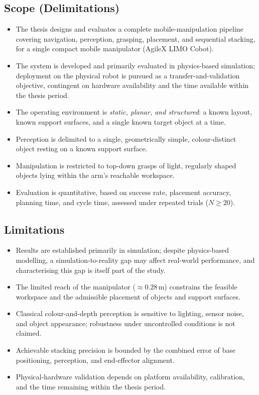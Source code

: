 \documentclass[11pt,a4paper]{article}
\begin{document}
\subsection{Scope (Delimitations)}
\begin{itemize}[label=\checkmark, leftmargin=1.5em, itemsep=0.3em]
    \item The thesis designs and evaluates a complete mobile-manipulation pipeline
          covering navigation, perception, grasping, placement, and sequential stacking,
          for a single compact mobile manipulator (AgileX LIMO Cobot).
    \item The system is developed and primarily evaluated in physics-based simulation;
          deployment on the physical robot is pursued as a transfer-and-validation
          objective, contingent on hardware availability and the time available within
          the thesis period.
    \item The operating environment is \emph{static, planar, and structured}: a known
          layout, known support surfaces, and a single known target object at a time.
    \item Perception is delimited to a single, geometrically simple, colour-distinct
          object resting on a known support surface.
    \item Manipulation is restricted to top-down grasps of light, regularly shaped
          objects lying within the arm's reachable workspace.
    \item Evaluation is quantitative, based on success rate, placement accuracy, planning
          time, and cycle time, assessed under repeated trials ($N \geq 20$).
\end{itemize}

\subsection{Limitations}
\begin{itemize}[label=\textbullet, leftmargin=1.5em, itemsep=0.3em]
    \item Results are established primarily in simulation; despite physics-based
          modelling, a simulation-to-reality gap may affect real-world performance, and
          characterising this gap is itself part of the study.
    \item The limited reach of the manipulator ($\approx 0.28$\,m) constrains the
          feasible workspace and the admissible placement of objects and support surfaces.
    \item Classical colour-and-depth perception is sensitive to lighting, sensor noise,
          and object appearance; robustness under uncontrolled conditions is not claimed.
    \item Achievable stacking precision is bounded by the combined error of base
          positioning, perception, and end-effector alignment.
    \item Physical-hardware validation depends on platform availability, calibration, and
          the time remaining within the thesis period.
\end{itemize}
\end{document}
